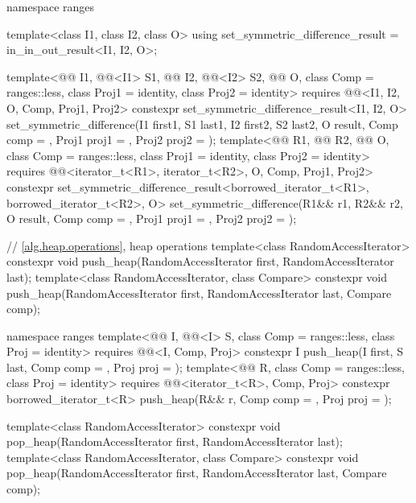 \begin{codeblock}
{  namespace ranges {
    template<class I1, class I2, class O>
      using set_symmetric_difference_result = in_in_out_result<I1, I2, O>;

    template<@@ I1, @@<I1> S1, @@ I2, @@<I2> S2,
             @@ O, class Comp = ranges::less,
             class Proj1 = identity, class Proj2 = identity>
      requires @@<I1, I2, O, Comp, Proj1, Proj2>
      constexpr set_symmetric_difference_result<I1, I2, O>
        set_symmetric_difference(I1 first1, S1 last1, I2 first2, S2 last2, O result,
                                 Comp comp = {}, Proj1 proj1 = {},
                                 Proj2 proj2 = {});
    template<@@ R1, @@ R2, @@ O,
             class Comp = ranges::less, class Proj1 = identity, class Proj2 = identity>
      requires @@<iterator_t<R1>, iterator_t<R2>, O, Comp, Proj1, Proj2>
      constexpr set_symmetric_difference_result<borrowed_iterator_t<R1>,
                                                borrowed_iterator_t<R2>, O>
        set_symmetric_difference(R1&& r1, R2&& r2, O result, Comp comp = {},
                                 Proj1 proj1 = {}, Proj2 proj2 = {});
  }

  // \ref{alg.heap.operations}, heap operations
  template<class RandomAccessIterator>
    constexpr void push_heap(RandomAccessIterator first, RandomAccessIterator last);
  template<class RandomAccessIterator, class Compare>
    constexpr void push_heap(RandomAccessIterator first, RandomAccessIterator last,
                             Compare comp);

  namespace ranges {
    template<@@ I, @@<I> S, class Comp = ranges::less,
             class Proj = identity>
      requires @@<I, Comp, Proj>
      constexpr I
        push_heap(I first, S last, Comp comp = {}, Proj proj = {});
    template<@@ R, class Comp = ranges::less, class Proj = identity>
      requires @@<iterator_t<R>, Comp, Proj>
      constexpr borrowed_iterator_t<R>
        push_heap(R&& r, Comp comp = {}, Proj proj = {});
  }

  template<class RandomAccessIterator>
    constexpr void pop_heap(RandomAccessIterator first, RandomAccessIterator last);
  template<class RandomAccessIterator, class Compare>
    constexpr void pop_heap(RandomAccessIterator first, RandomAccessIterator last,
                            Compare comp);

}
\end{codeblock}
